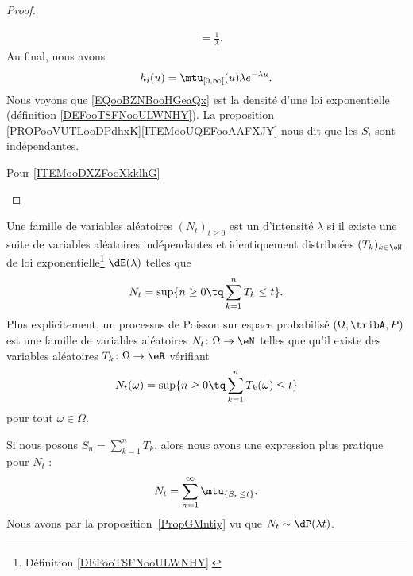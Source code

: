 \begin{proof}
\begin{subproof}
\begin{subequations}
\begin{align}
				                                                                       & =\frac{1}{ \lambda }.
			\end{align}
		\end{subequations}
		Au final, nous avons
		\begin{equation}        \label{EQooBZNBooHGeaQx}
			h_i(u)=\mtu_{\mathopen[ 0 , \infty \mathclose[}(u)\lambda  e^{-\lambda u}.
		\end{equation}
		\spitem[Conclusions]
		Nous voyons que \eqref{EQooBZNBooHGeaQx} est la densité d'une loi exponentielle (définition \ref{DEFooTSFNooULWNHY}). La proposition \ref{PROPooVUTLooDPdhxK}\ref{ITEMooUQEFooAAFXJY} nous dit que les \( S_i\) sont indépendantes.
	\end{subproof}


	\begin{center}
		Pour \ref{ITEMooDXZFooXkklhG}
	\end{center}


\end{proof}

\begin{definition}      \label{DEFooWXHEooEHQUJU}
	Une famille de variables aléatoires \( (N_t)_{t\geq 0}\) est un  d'intensité \( \lambda\) si il existe une suite de variables aléatoires indépendantes et identiquement distribuées \( (T_k)_{k\in \eN}\) de loi exponentielle\footnote{Définition \ref{DEFooTSFNooULWNHY}.} \( \dE(\lambda)\) telles que
	\begin{equation}
		N_t=\sup\{ n\geq 0\tq \sum_{k=1}^nT_k\leq t \}.
	\end{equation}
	Plus explicitement, un processus de Poisson sur espace probabilisé \( (\Omega,\tribA,P)\) est une famille de variables aléatoires \( N_t\colon \Omega\to \eN\) telles que qu'il existe des variables aléatoires \( T_k\colon \Omega\to \eR\) vérifiant
	\begin{equation}
		N_t(\omega)=\sup\{ n\geq 0\tq \sum_{k=1}^nT_k(\omega)\leq t \}
	\end{equation}
	pour tout \( \omega\in\Omega\).
\end{definition}
Si nous posons \( S_n=\sum_{k=1}^nT_k\), alors nous avons une expression plus pratique pour \( N_t\) :
\begin{equation}
	N_t=\sum_{n=1}^{\infty}\mtu_{\{ S_n\leq t \}}.
\end{equation}
Nous avons par la proposition~\ref{PropGMntiy} vu que \( N_t\sim\dP(\lambda t)\).


